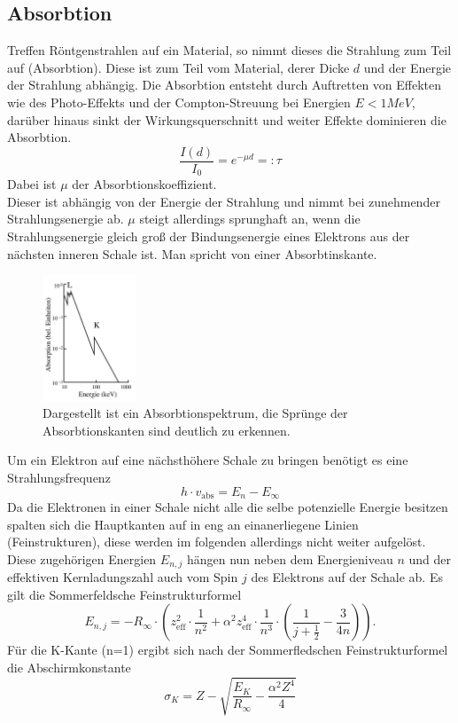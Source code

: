 \subsection{Absorbtion}
Treffen Röntgenstrahlen auf ein Material, so nimmt dieses die Strahlung zum Teil
auf (Absorbtion). Diese ist zum Teil vom Material, derer Dicke $d$ und der Energie 
der Strahlung abhängig.
Die Absorbtion entsteht durch Auftretten von Effekten wie des Photo-Effekts und der
Compton-Streuung bei Energien $E<1\si{MeV}$, darüber hinaus sinkt der Wirkungsquerschnitt 
und weiter Effekte dominieren die Absorbtion.
\begin{equation}
    \frac{I(d)}{I_0}=e^{-\mu d}=:\tau
\end{equation}
Dabei ist $\mu$ der Absorbtionskoeffizient.\\
Dieser ist abhängig von der Energie der Strahlung und nimmt bei zunehmender
Strahlungsenergie ab. $\mu$ steigt allerdings sprunghaft an, wenn die Strahlungsenergie
gleich groß der Bindungsenergie eines Elektrons aus der nächsten inneren Schale ist.
Man spricht von einer Absorbtinskante.
\begin{figure}[H]
    \centering
    \includegraphics[width=0.25\textwidth]{plots/kante.jpg}
    \caption{Dargestellt ist ein Absorbtionspektrum, die Sprünge der Absorbtionskanten sind deutlich zu erkennen.\cite[2]{anleitung}}
\end{figure}
Um ein Elektron auf eine nächsthöhere Schale zu bringen benötigt es eine Strahlungsfrequenz
\begin{equation}
    h\cdot v_{\text{abs}}=E_n-E_{\infty}
\end{equation}
Da die Elektronen in einer Schale nicht alle die selbe potenzielle Energie
besitzen spalten sich die Hauptkanten auf in eng an einanerliegene Linien (Feinstrukturen),
diese werden im folgenden allerdings nicht weiter aufgelöst. Diese zugehörigen
Energien $E_{n,j}$ hängen nun neben dem Energieniveau $n$ und der effektiven Kernladungszahl
auch vom Spin $j$ des Elektrons auf der Schale ab.
Es gilt die Sommerfeldsche Feinstrukturformel
\begin{equation}
    E_{n,j}=-R_{\infty}\cdot \left(z_{\text{eff}}^2\cdot \frac{1}{n^2}+\alpha^2z_{\text{eff}}^4\cdot \frac{1}{n^3}\cdot \left(\frac{1}{j+\frac{1}{2}}-\frac{3}{4n}\right)\right).
\end{equation}
Für die K-Kante (n=1) ergibt sich nach der Sommerfledschen Feinstrukturformel
die Abschirmkonstante
\begin{equation}
    \sigma_K=Z-\sqrt{\frac{E_K}{R_{\infty}}-\frac{\alpha^2Z^4}{4}}
    \label{eqn:sigmaZ}
\end{equation}

